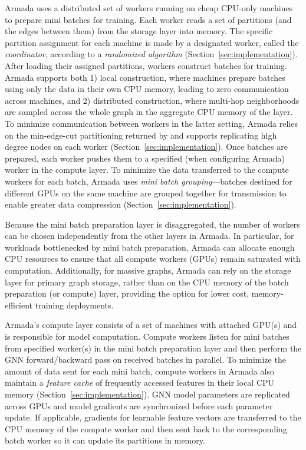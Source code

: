 Armada uses a distributed set of workers running on cheap CPU-only machines to prepare mini batches for training.
Each worker reads a set of partitions (and the edges between them) from the storage layer into memory. The specific partition assignment for each machine is made by a designated worker, called the \textit{coordinator}, according to a \textit{randomized algorithm} (Section~\ref{sec:implementation}). After loading their assigned partitions, workers construct batches for training. Armada supports both 1) local construction, where machines prepare batches using only the data in their own CPU memory, leading to zero communication across machines, and 2) distributed construction, where multi-hop neighborhoods are sampled across the whole graph in the aggregate CPU memory of the layer. To minimize communication between workers in the latter setting, Armada relies on the min-edge-cut partitioning returned by \partitioning and supports replicating high degree nodes on each worker (Section~\ref{sec:implementation}). Once batches are prepared, each worker pushes them to a specified (when configuring Armada) worker in the compute layer. To minimize the data transferred to the compute workers for each batch, Armada uses \textit{mini batch grouping}---batches destined for different GPUs on the same machine are grouped together for transmission to enable greater data compression (Section~\ref{sec:implementation}).

Because the mini batch preparation layer is disaggregated, the number of workers can be chosen independently from the other layers in Armada. In particular, for workloads bottlenecked by mini batch preparation, Armada can allocate enough CPU resources to ensure that all compute workers (GPUs) remain saturated with computation. Additionally, for massive graphs, Armada can rely on the storage layer for primary graph storage, rather than on the CPU memory of the batch preparation (or compute) layer, providing the option for lower cost, memory-efficient training deployments.



Armada's compute layer consists of a set of machines with attached GPU(s) and is responsible for model computation. Compute workers listen for mini batches from specified worker(s) in the mini batch preparation layer and then perform the GNN forward/backward pass on received batches in parallel. To minimize the amount of data sent for each mini batch, compute workers in Armada also maintain a \textit{feature cache} of frequently accessed features in their local CPU memory (Section~\ref{sec:implementation}). GNN model parameters are replicated across GPUs and model gradients are synchronized before each parameter update. If applicable, gradients for learnable feature vectors are transferred to the CPU memory of the compute worker and then sent back to the corresponding batch worker so it can update its partitions in memory.